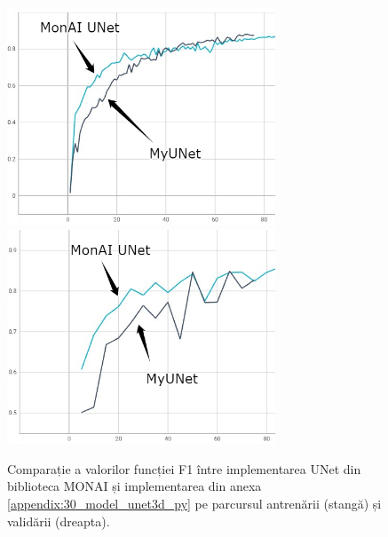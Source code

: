 \begin{figure}[!htb]
    \centering
    \includegraphics[width=8cm]{images/seg_train_results/UNET_train_comp.png}
    \includegraphics[width=8cm]{images/seg_train_results/UNET_valid_comp.png}
    \\
    \caption{Comparație a valorilor funcției F1 între implementarea UNet din biblioteca MONAI și implementarea din anexa \ref{appendix:30_model_unet3d_py} pe parcursul antrenării (stangă) și validării (dreapta).}
    \label{fig:comp_unet}
\end{figure}

